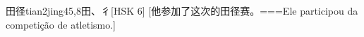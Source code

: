 \begin{EntryWithPhonetic}{田径}{tian2jing4}{5,8}{⽥、⼻}[HSK 6]
  [他参加了这次的田径赛。===Ele participou da competição de atletismo.]
\end{EntryWithPhonetic}


